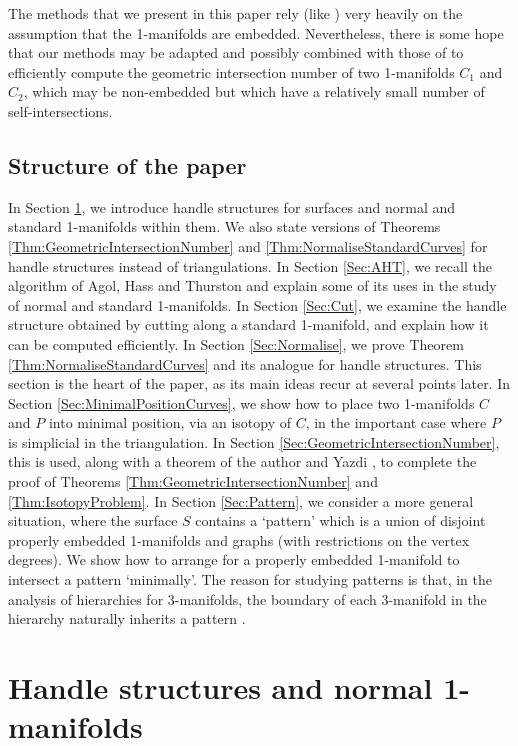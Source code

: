 \documentclass[oneside]{amsart}
\numberwithin{equation}{section}
\theoremstyle{plain}
\theoremstyle{definition}
\begin{document}
The methods that we present in this paper rely (like \cite{SSS2, BellWebb, Dynnikov}) very heavily on the assumption that the 1-manifolds are embedded. Nevertheless, there is some hope that our methods may be adapted and possibly combined with those of \cite{DespreLazarus, dubois, ChangdeMesmay} to efficiently compute the geometric intersection number of two 1-manifolds $C_1$ and $C_2$, which may be non-embedded but which have a relatively small number of self-intersections.

\subsection{Structure of the paper} In Section \ref{Sec:HSNormal}, we introduce handle structures for surfaces and normal and standard 1-manifolds within them. We also state versions of Theorems \ref{Thm:GeometricIntersectionNumber} and \ref{Thm:NormaliseStandardCurves} for handle structures instead of triangulations. In Section \ref{Sec:AHT}, we recall the algorithm of Agol, Hass and Thurston \cite{AHT} and explain some of its uses in the study of normal and standard 1-manifolds. In Section \ref{Sec:Cut}, we examine the handle structure obtained by cutting along a standard 1-manifold, and explain how it can be computed efficiently. In Section \ref{Sec:Normalise}, we prove Theorem \ref{Thm:NormaliseStandardCurves} and its analogue for handle structures. This section is the heart of the paper, as its main ideas recur at several points later. In Section \ref{Sec:MinimalPositionCurves}, we show how to place two 1-manifolds $C$ and $P$ into minimal position, via an isotopy of $C$, in the important case where $P$ is simplicial in the triangulation. In Section \ref{Sec:GeometricIntersectionNumber},
this is used, along with a theorem of the author and Yazdi \cite{LackenbyYazdi}, to complete the proof of Theorems \ref{Thm:GeometricIntersectionNumber} and \ref{Thm:IsotopyProblem}. In Section \ref{Sec:Pattern}, we consider a more general situation, where the surface $S$ contains a `pattern' which is a union of disjoint properly embedded 1-manifolds and graphs (with restrictions on the vertex degrees). We show how to arrange for a properly embedded 1-manifold to intersect a pattern `minimally'. The reason for studying patterns is that, in the analysis of hierarchies for 3-manifolds, the boundary of each 3-manifold in the hierarchy naturally inherits a pattern \cite{HakenHomeomorphism, Matveev}.


\section{Handle structures and normal 1-manifolds}
\label{Sec:HSNormal}
\end{document}
